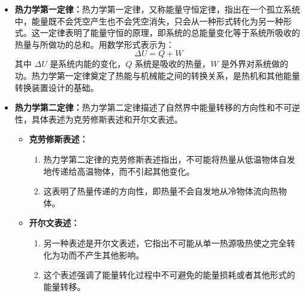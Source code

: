 \documentclass[dvipsnames, svgnames,a4paper,11pt]{article}
\begin{document}
        \begin{itemize}
            \item \textbf{热力学第一定律：}热力学第一定律，又称能量守恒定律，指出在一个孤立系统中，能量既不会凭空产生也不会凭空消失，只会从一种形式转化为另一种形式。这一定律表明了能量守恒的原理，即系统的总能量变化等于系统所吸收的热量与所做功的总和。用数学形式表示为：
            \[
            \Delta U = Q + W
            \]
            其中 $\Delta U$ 是系统内能的变化，$Q$ 系统是吸收的热量，$W$ 是外界对系统做的功。热力学第一定律奠定了热能与机械能之间的转换关系，是热机和其他能量转换装置设计的基础。
            

            \item \textbf{热力学第二定律：}热力学第二定律描述了自然界中能量转移的方向性和不可逆性，具体表述为克劳修斯表述和开尔文表述。

                \begin{itemize}
                    \item \textbf{克劳修斯表述：}
                    \begin{enumerate}
                        \item 热力学第二定律的克劳修斯表述指出，不可能将热量从低温物体自发地传递给高温物体，而不引起其他变化。
                        \item 这表明了热量传递的方向性，即热量不会自发地从冷物体流向热物体。
                    \end{enumerate}
                    
                    \item \textbf{开尔文表述：}
                    \begin{enumerate}
                        \item 另一种表述是开尔文表述，它指出不可能从单一热源吸热使之完全转化为功而不产生其他影响。
                        \item 这个表述强调了能量转化过程中不可避免的能量损耗或者其他形式的能量转移。
                    \end{enumerate}
                \end{itemize}

        
        \end{itemize}



                    
\end{document}
